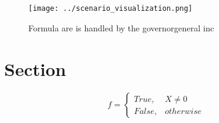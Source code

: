 \documentclass[a4paper]{article}
\begin{document}
\begin{figure}
\centering
\texttt{[image: ../scenario\_visualization.png]}
\caption{Formula are is handled by the governorgeneral inc
}
\end{figure}
 
\section{Section}

\begin{equation}   f =
\begin{cases} True, & X \neq 0\\
False, & otherwise
\end{cases}
\end{equation}
\end{document}
